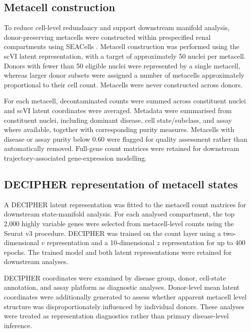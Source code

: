 \documentclass[10pt,letterpaper]{article}
\begin{document}
\subsection*{Metacell construction}

To reduce cell-level redundancy and support downstream manifold analysis, donor-preserving metacells were constructed within prespecified renal compartments using SEACells \cite{Persad2022.04.02.486748}. Metacell construction was performed using the scVI latent representation, with a target of approximately 50 nuclei per metacell. Donors with fewer than 50 eligible nuclei were represented by a single metacell, whereas larger donor subsets were assigned a number of metacells approximately proportional to their cell count. Metacells were never constructed across donors.

For each metacell, decontaminated counts were summed across constituent nuclei and scVI latent coordinates were averaged. Metadata were summarised from constituent nuclei, including dominant disease, cell state/subclass, and assay where available, together with corresponding purity measures. Metacells with disease or assay purity below 0.60 were flagged for quality assessment rather than automatically removed. Full-gene count matrices were retained for downstream trajectory-associated gene-expression modelling.

\subsection*{DECIPHER representation of metacell states}

A DECIPHER latent representation \cite{nazaretJointRepresentationVisualization2025} was fitted to the metacell count matrices for downstream state-manifold analysis. For each analysed compartment, the top 2,000 highly variable genes were selected from metacell-level counts using the Seurat v3 \cite{seurat3} procedure. DECIPHER was trained on the count layer using a two-dimensional $v$ representation and a 10-dimensional $z$ representation for up to 400 epochs. The trained model and both latent representations were retained for downstream analyses.

DECIPHER coordinates were examined by disease group, donor, cell-state annotation, and assay platform as diagnostic analyses. Donor-level mean latent coordinates were additionally generated to assess whether apparent metacell level structure was disproportionately influenced by individual donors. These analyses were treated as representation diagnostics rather than primary disease-level inference.
\end{document}
